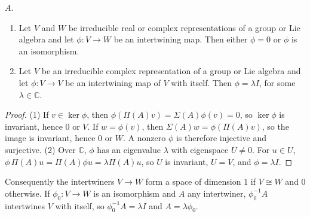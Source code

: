 $A$.
\begin{theorem}\label{haar:thm:schur}
\begin{enumerate}
\item Let $V$ and $W$ be irreducible real or complex representations of a
group or Lie algebra and let $\phi\colon V\to W$ be an intertwining map.
Then either $\phi=0$ or $\phi$ is an isomorphism.
\item Let $V$ be an irreducible complex representation of a group or Lie
algebra and let $\phi\colon V\to V$ be an intertwining map of $V$ with
itself. Then $\phi=\lambda I$, for some $\lambda\in\mathbb C$.
\end{enumerate}
\end{theorem}
\begin{proof}
(1) If $v\in\ker\phi$, then $\phi(\Pi(A)v)=\Sigma(A)\phi(v)=0$, so
$\ker\phi$ is invariant, hence $0$ or $V$. If $w=\phi(v)$, then
$\Sigma(A)w=\phi(\Pi(A)v)$, so the image is invariant, hence $0$ or $W$.
A nonzero $\phi$ is therefore injective and surjective.
(2) Over $\mathbb C$, $\phi$ has an eigenvalue $\lambda$ with eigenspace
$U\ne0$. For $u\in U$, $\phi\,\Pi(A)u=\Pi(A)\phi u=\lambda\Pi(A)u$, so $U$ is
invariant, $U=V$, and $\phi=\lambda I$.
\end{proof}
Consequently the intertwiners $V\to W$ form a space of dimension $1$ if
$V\cong W$ and $0$ otherwise. If $\phi_0\colon V\to W$ is an isomorphism and
$A$ any intertwiner, $\phi_0^{-1}A$ intertwines $V$ with itself, so
$\phi_0^{-1}A=\lambda I$ and $A=\lambda\phi_0$.


